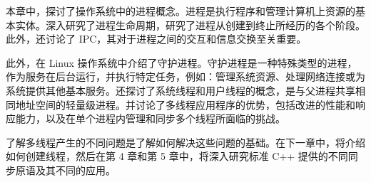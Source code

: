 本章中，探讨了操作系统中的进程概念。进程是执行程序和管理计算机上资源的基本实体。深入研究了进程生命周期，研究了进程从创建到终止所经历的各个阶段。此外，还讨论了 IPC，其对于进程之间的交互和信息交换至关重要。

此外，在 Linux 操作系统中介绍了守护进程。守护进程是一种特殊类型的进程，作为服务在后台运行，并执行特定任务，例如：管理系统资源、处理网络连接或为系统提供其他基本服务。还探讨了系统线程和用户线程的概念，是与父进程共享相同地址空间的轻量级进程。并讨论了多线程应用程序的优势，包括改进的性能和响应能力，以及在单个进程内管理和同步多个线程所面临的挑战。

了解多线程产生的不同问题是了解如何解决这些问题的基础。在下一章中，将介绍如何创建线程，然后在第 4 章和第 5 章中，将深入研究标准 C++ 提供的不同同步原语及其不同的应用。